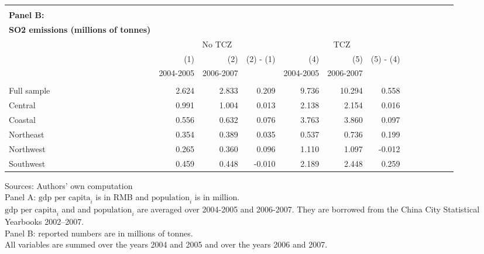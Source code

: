 \documentclass[12pt]{article}
\begin{document}
\begin{table}[!htb]
\begin{adjustbox}{width=\textwidth, totalheight=\baselineskip,keepaspectratio}
\begin{tabular}{lrrrrrrrrrrrr}
      \bottomrule
      \\ %
        \multicolumn{1}{l}{\textbf{Panel B:}} \\
        \multicolumn{1}{l}{\textbf{SO2 emissions (millions of tonnes)}} \\
        \toprule
       & \multicolumn{3}{c}{No TCZ} & \multicolumn{3}{c}{TCZ} \\
      & (1)  & (2) & (2) - (1) & (4)  & (5)  &(5) - (4) \\
      & 2004-2005 &  2006-2007 & &  2004-2005 &2006-2007  \\
\hline \\[-1.8ex] 
Full sample &  2.624  & 2.833  &  0.209 &  9.736 &10.294  &  0.558  \\
Central     &  0.991  & 1.004  &  0.013 & 2.138 & 2.154  &   0.016  \\
Coastal     &  0.556  & 0.632  &  0.076 & 3.763 & 3.860 &   0.097  \\
Northeast   &  0.354  & 0.389  &  0.035 & 0.537 & 0.736 &    0.199  \\
Northwest   &  0.265  &  0.360 &  0.096 & 1.110 & 1.097 &    -0.012  \\
Southwest   &  0.459  & 0.448  &  -0.010 & 2.189 &  2.448 &   0.259  \\
      \bottomrule
      \hline
    \end{tabular}
    \end{adjustbox}
    \begin{tablenotes}
      \small
      \item 
      \footnotesize{
      Sources: Authors' own computation \\
  Panel A: $\text{gdp per capita}_i$ is in RMB and $\text{population}_i$ is in million. \\ $\text{gdp per capita}_i$ and and $\text{population}_i$ are averaged over 2004-2005 and 2006-2007. They are borrowed from the China City Statistical Yearbooks 2002–2007. \\
  Panel B: reported numbers are in millions of tonnes.  \\
  All variables are summed over the years 2004 and 2005 and over the years 2006 and 2007. 
      }
    \end{tablenotes}
\end{table}
\end{document}
